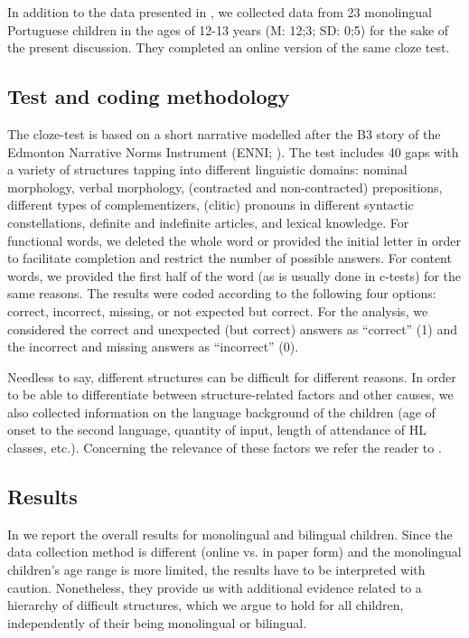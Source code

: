 \documentclass[output=paper]{langscibook}
\begin{document}
In addition to the data presented in \citet{TorregrossaRinke2022}, we collected data from 23 monolingual Portuguese children in the ages of 12-13 years (M: 12;3; SD: 0;5) for the sake of the present discussion. They completed an online version of the same cloze test.

\subsection{Test and coding methodology}\label{sec:rinke:2.2}

The cloze-test is based on a short narrative modelled after the B3 story of the Edmonton Narrative Norms Instrument (ENNI; \citealt{BongartzTorregrossa2020, SchneiderHayward2005}). The test includes 40 gaps with a variety of structures tapping into different linguistic domains: nominal morphology, verbal morphology, (contracted and non-contracted) prepositions, different types of complementizers, (clitic) pronouns in different syntactic constellations, definite and indefinite articles, and lexical knowledge. For functional words, we deleted the whole word or provided the initial letter in order to facilitate completion and restrict the number of possible answers. For content words, we provided the first half of the word (as is usually done in c-tests) for the same reasons. The results were coded according to the following four options: correct, incorrect, missing, or not expected but correct. For the analysis, we considered the correct and unexpected (but correct) answers as “correct” (1) and the incorrect and missing answers as “incorrect” (0).

Needless to say, different structures can be difficult for different reasons. In order to be able to differentiate between structure-related factors and other causes, we also collected information on the language background of the children (age of onset to the second language, quantity of input, length of attendance of HL classes, etc.). Concerning the relevance of these factors we refer the reader to \citet{TorregrossaRinke2022}. 

\subsection{Results}\label{sec:rinke:2.3}

In  we report the overall results for monolingual and bilingual children. Since the data collection method is different (online vs. in paper form) and the monolingual children's age range is more limited, the results have to be interpreted with caution. Nonetheless, they provide us with additional evidence related to a hierarchy of difficult structures, which we argue to hold for all children, independently of their being monolingual or bilingual.
\end{document}
